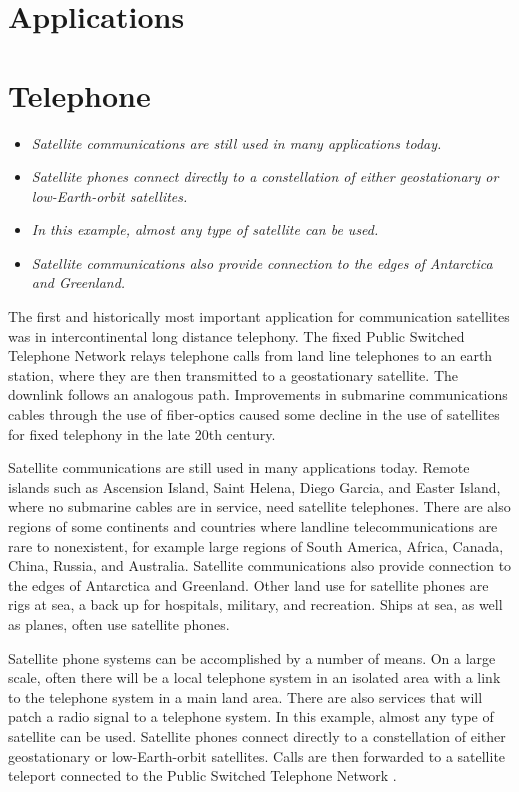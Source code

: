 \section{Applications}\label{applications}

\section{Telephone}\label{telephone}

\begin{itemize}
\item
  \emph{Satellite communications are still used in many applications
  today.}
\item
  \emph{Satellite phones connect directly to a constellation of either
  geostationary or low-Earth-orbit satellites.}
\item
  \emph{In this example, almost any type of satellite can be used.}
\item
  \emph{Satellite communications also provide connection to the edges of
  Antarctica and Greenland.}
\end{itemize}

The first and historically most important application for communication
satellites was in intercontinental long distance telephony. The fixed
Public Switched Telephone Network relays telephone calls from land line
telephones to an earth station, where they are then transmitted to a
geostationary satellite. The downlink follows an analogous path.
Improvements in submarine communications cables through the use of
fiber-optics caused some decline in the use of satellites for fixed
telephony in the late 20th century.

Satellite communications are still used in many applications today.
Remote islands such as Ascension Island, Saint Helena, Diego Garcia, and
Easter Island, where no submarine cables are in service, need satellite
telephones. There are also regions of some continents and countries
where landline telecommunications are rare to nonexistent, for example
large regions of South America, Africa, Canada, China, Russia, and
Australia. Satellite communications also provide connection to the edges
of Antarctica and Greenland. Other land use for satellite phones are
rigs at sea, a back up for hospitals, military, and recreation. Ships at
sea, as well as planes, often use satellite phones.

Satellite phone systems can be accomplished by a number of means. On a
large scale, often there will be a local telephone system in an isolated
area with a link to the telephone system in a main land area. There are
also services that will patch a radio signal to a telephone system. In
this example, almost any type of satellite can be used. Satellite phones
connect directly to a constellation of either geostationary or
low-Earth-orbit satellites. Calls are then forwarded to a satellite
teleport connected to the Public Switched Telephone Network .

